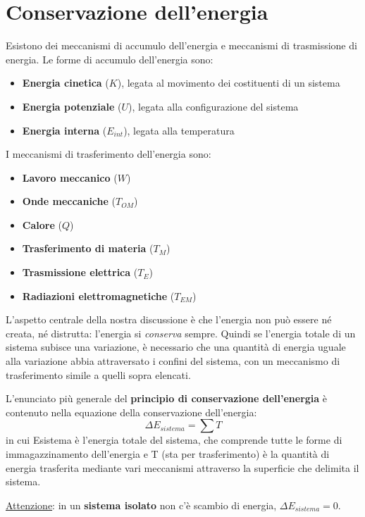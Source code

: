 \documentclass[a4paper,11pt,oneside]{book}
\begin{document}
\section{Conservazione dell'energia}
Esistono dei meccanismi di accumulo dell'energia e meccanismi di trasmissione di energia.
Le forme di accumulo dell'energia sono:
\begin{itemize}
    \item \textbf{Energia cinetica} ($K$), legata al movimento dei costituenti di un sistema
    \item \textbf{Energia potenziale} ($U$), legata alla configurazione del sistema
    \item \textbf{Energia interna} ($E_{int}$), legata alla temperatura
\end{itemize}
I meccanismi di trasferimento dell'energia sono:
\begin{itemize}
    \item \textbf{Lavoro meccanico} ($W$)
    \item \textbf{Onde meccaniche} ($T_{OM}$)
    \item \textbf{Calore} ($Q$)
    \item \textbf{Trasferimento di materia} ($T_M$)
    \item \textbf{Trasmissione elettrica} ($T_E$)
    \item \textbf{Radiazioni elettromagnetiche}  ($T_{EM}$)
\end{itemize}

L'aspetto centrale della nostra discussione è che l’energia non può essere né creata, né distrutta: l’energia si \emph{conserva} sempre.
Quindi se l’energia totale di un sistema subisce una variazione, è necessario che una quantità di energia uguale alla variazione abbia attraversato i confini del sistema, con un meccanismo di trasferimento simile a quelli sopra elencati.

L’enunciato più generale del \textbf{principio di conservazione dell’energia} è contenuto nella equazione della conservazione dell’energia:
\begin{equation*}
    \Delta E_{sistema} = \sum T
\end{equation*}
in cui Esistema è l’energia totale del sistema, che comprende tutte le forme di immagazzinamento dell’energia e T (sta per trasferimento) è la quantità di energia 
trasferita mediante vari meccanismi attraverso la superficie che delimita il sistema.

\underline{Attenzione}: in un \textbf{sistema isolato} non c'è scambio di energia, $\Delta E_{sistema} = 0$.
\end{document}

